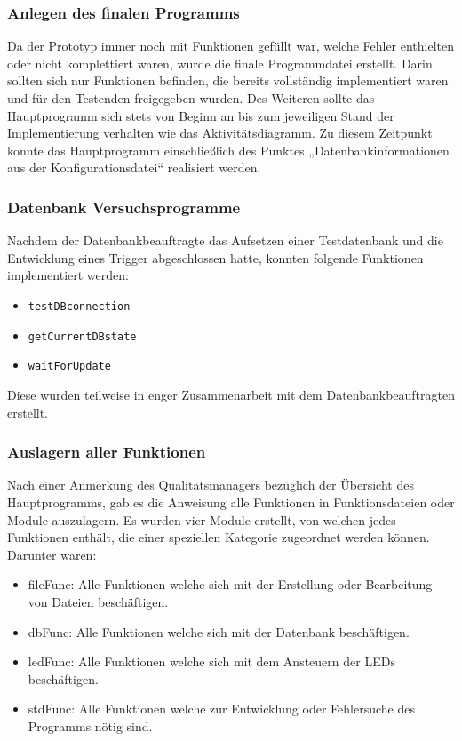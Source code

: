 \subsubsection{Anlegen des finalen Programms}
Da der Prototyp immer noch mit Funktionen gefüllt war, welche Fehler enthielten oder nicht komplettiert waren, wurde die finale Programmdatei erstellt. Darin sollten sich nur Funktionen befinden, die bereits vollständig implementiert waren und für den Testenden freigegeben wurden. Des Weiteren sollte das Hauptprogramm sich stets von Beginn an bis zum jeweiligen Stand der Implementierung verhalten wie das Aktivitätsdiagramm. Zu diesem Zeitpunkt konnte das Hauptprogramm einschließlich des Punktes „Datenbankinformationen aus der Konfigurationsdatei“ realisiert werden.

\subsubsection{Datenbank Versuchsprogramme}
Nachdem der Datenbankbeauftragte das Aufsetzen einer Testdatenbank und die Entwicklung eines Trigger abgeschlossen hatte, konnten folgende Funktionen implementiert werden:
\begin{itemize}
	\item \texttt{testDBconnection}
	\item \texttt{getCurrentDBstate}
	\item \texttt{waitForUpdate}
\end{itemize}
Diese wurden teilweise in enger Zusammenarbeit mit dem Datenbankbeauftragten erstellt.

\subsubsection{Auslagern aller Funktionen}
Nach einer Anmerkung des Qualitätsmanagers bezüglich der Übersicht des Hauptprogramms, gab es die Anweisung alle Funktionen in Funktionsdateien oder Module auszulagern. Es wurden vier Module erstellt, von welchen jedes Funktionen enthält, die einer speziellen Kategorie zugeordnet werden können. Darunter waren:
\begin{itemize}
	\item fileFunc: Alle Funktionen welche sich mit der Erstellung oder Bearbeitung von Dateien beschäftigen.
	\item dbFunc: Alle Funktionen welche sich mit der Datenbank beschäftigen.
	\item ledFunc: Alle Funktionen welche sich mit dem Ansteuern der LEDs beschäftigen.
	\item stdFunc: Alle Funktionen welche zur Entwicklung oder Fehlersuche des Programms nötig sind.
\end{itemize}

